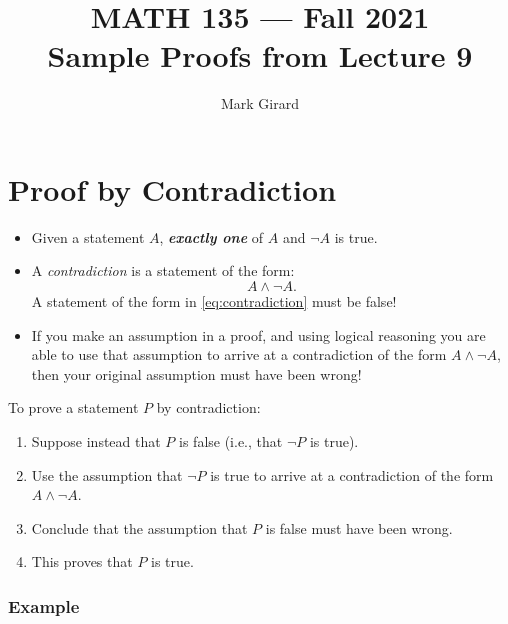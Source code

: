 \documentclass[11pt]{article}
\theoremstyle{plain}
\theoremstyle{plain}
\theoremstyle{remark}
\begin{document}
\title{MATH 135 --- Fall 2021\\ Sample Proofs from Lecture 9}
\author{Mark Girard}

\maketitle

\section*{Proof by Contradiction}
\begin{itemize}
 \item Given a statement $A$, \emph{\textbf{exactly one}} of $A$ and $\neg A$ is true. 
 \item A \emph{contradiction} is a statement of the form:
\[
A\wedge \neg A.
\tag{$\ast$}\label{eq:contradiction}
\]
A statement of the form in \eqref{eq:contradiction} must be false!
\item If you make an assumption in a proof, and using logical reasoning you are able to use that assumption to arrive at a contradiction of the form $A\wedge \neg A$, then your original assumption must have been wrong!
\end{itemize}

 \noindent To prove a statement $P$ by contradiction:
 \begin{enumerate}
 \item Suppose instead that $P$ is false (i.e., that $\neg P$ is true).
 \item Use the assumption that $\neg P$ is true to arrive at a contradiction of the form $A\wedge \neg A$.
 \item Conclude that the assumption that $P$ is false must have been wrong.
 \item This proves that $P$ is true.
\end{enumerate}



\subsubsection*{Example}
\end{document}
